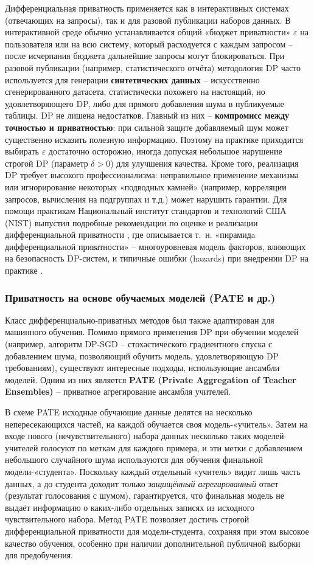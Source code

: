 Дифференциальная приватность применяется как в интерактивных системах (отвечающих на запросы), так и для разовой публикации наборов
данных. В интерактивной среде обычно устанавливается общий «бюджет приватности» $\varepsilon$ на пользователя или на всю
систему, который расходуется с каждым запросом – после исчерпания бюджета дальнейшие запросы могут блокироваться. При
разовой публикации (например, статистического отчёта) методология DP часто используется для генерации
\textbf{синтетических данных} – искусственно сгенерированного датасета, статистически похожего на настоящий, но
удовлетворяющего DP, либо для прямого добавления шума в публикуемые таблицы. DP не лишена недостатков. Главный из них –
\textbf{компромисс между точностью и приватностью}: при сильной защите добавляемый шум может существенно исказить
полезную информацию. Поэтому на практике приходится выбирать $\varepsilon$ достаточно осторожно, иногда допуская
небольшое нарушение строгой DP (параметр $\delta>0$) для улучшения качества. Кроме того, реализация DP требует высокого
профессионализма: неправильное применение механизма или игнорирование некоторых «подводных камней» (например, корреляции
запросов, вычисления на подгруппах и т.д.) может нарушить гарантии. Для помощи практикам Национальный институт
стандартов и технологий США (NIST) выпустил подробные рекомендации по оценке и реализации дифференциальной приватности
\autocite{nvlpubs-nist-gov}, где описывается т. н. «пирамидa дифференциальной приватности» – многоуровневая модель
факторов, влияющих на безопасность DP-систем, и типичные ошибки (hazards) при внедрении DP на практике
\autocite{nvlpubs-nist-gov}.

\subsubsection{Приватность на основе обучаемых моделей (PATE и др.)}

Класс дифференциально-приватных методов был также адаптирован для машинного обучения. Помимо прямого применения DP при
обучении моделей (например, алгоритм DP-SGD – стохастического градиентного спуска с добавлением шума, позволяющий
обучить модель, удовлетворяющую DP требованиям), существуют интересные подходы, использующие ансамбли моделей. Одним из
них является \textbf{PATE (Private Aggregation of Teacher Ensembles)} – приватное агрегирование ансамбля учителей.

В схеме PATE исходные обучающие данные делятся на несколько непересекающихся частей, на каждой обучается своя
модель-«учитель». Затем на входе нового (нечувствительного) набора данных несколько таких моделей-учителей голосуют по
меткам для каждого примера, и эти метки с добавлением небольшого случайного шума используются для обучения финальной
модели-«студента». Поскольку каждый отдельный «учитель» видит лишь часть данных, а до студента доходит только
\textit{защищённый агрегированный} ответ (результат голосования с шумом), гарантируется, что финальная модель не выдаёт
информацию о каких-либо отдельных записях из исходного чувствительного набора. Метод PATE позволяет достичь строгой
дифференциальной приватности для модели-студента, сохраняя при этом высокое качество обучения, особенно при наличии
дополнительной публичной выборки для предобучения.

